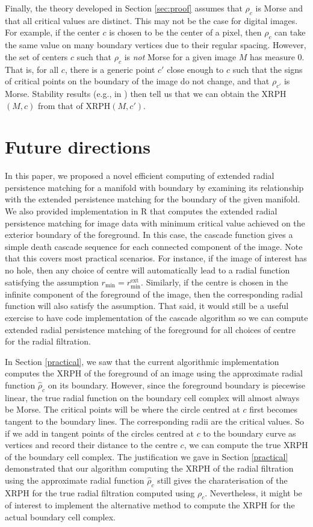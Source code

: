 \documentclass[a4paper,11pt]{article}
\theoremstyle{definition}
\begin{document}
Finally, the theory developed in Section \ref{sec:proof} assumes that $\rho_c$ is Morse and that all critical values are distinct. This may not be the case for digital images. For example, if the center $c$ is chosen to be the center of a pixel, then $\rho_c$ can take the same value on many boundary vertices due to their regular spacing. 
However, the set of centers $c$ such that $\rho_c$ is \emph{not} Morse for a given image $M$ has measure 0.
That is, for all $c$, there is a generic point $c'$ close enough to $c$ such that the signs of critical points on the boundary of the image do not change, and that $\rho_{c'}$ is Morse. Stability results (e.g., in \cite{C2016}) then tell us that we can obtain the XRPH$(M,c)$ from that of XRPH$(M,c')$.

\section{Future directions}

In this paper, we proposed a novel efficient computing of extended radial persistence matching for a manifold with boundary by examining its relationship with the extended persistence matching for the boundary of the given manifold. We also provided implementation in R that computes the extended radial persistence matching for image data with minimum critical value achieved on the exterior boundary of the foreground. In this case, the cascade function gives a simple death cascade sequence for each connected component of the image. Note that this covers most practical scenarios. For instance, if the image of interest has no hole, then any choice of centre will automatically lead to a radial function satisfying the assumption $r_{\min}=r_{\min}^{\mathrm{ext}}$. Similarly, if the centre is chosen in the infinite component of the foreground of the image, then the corresponding radial function will also satisfy the assumption. That said, it would still be a useful exercise to have code implementation of the cascade algorithm so we can compute extended radial persistence matching of the foreground for all choices of centre for the radial filtration. 

In Section \ref{practical}, we saw that the current algorithmic implementation computes the XRPH of the foreground of an image using the approximate radial function $\hat{\rho}_c$ on its boundary. However, since the foreground boundary is piecewise linear, the true radial function on the boundary cell complex will almost always be Morse. The critical points will be where the circle centred at $c$ first becomes tangent to the boundary lines. The corresponding radii are the critical values. So if we add in tangent points of the circles centred at $c$ to the boundary curve as vertices and record their distance to the centre $c$, we can compute the true XRPH of the boundary cell complex. The justification we gave in Section \ref{practical} demonstrated that our algorithm computing the XRPH of the radial filtration using the approximate radial function $\hat{\rho}_c$ still gives the charaterisation of the XRPH for the true radial filtration computed using $\rho_c$. Nevertheless, it might be of interest to implement the alternative method to compute the XRPH for the actual boundary cell complex. 
\end{document}
